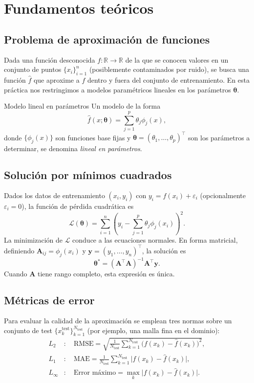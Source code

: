 \section{Fundamentos teóricos}

\subsection{Problema de aproximación de funciones}
Dada una función desconocida \(f: \mathbb{R} \to \mathbb{R}\) de la que se conocen valores en un conjunto de puntos \(\{x_i\}_{i=1}^n\) (posiblemente contaminados por ruido), se busca una función \(\hat{f}\) que aproxime a \(f\) dentro y fuera del conjunto de entrenamiento. En esta práctica nos restringimos a modelos paramétricos lineales en los parámetros \(\boldsymbol{\theta}\).

\begin{definicion}{Modelo lineal en parámetros}
Un modelo de la forma
\[
\hat{f}(x;\boldsymbol{\theta}) = \sum_{j=1}^{p} \theta_j \phi_j(x),
\]
donde \(\{\phi_j(x)\}\) son funciones base fijas y \(\boldsymbol{\theta} = (\theta_1,\dots,\theta_p)^\top\) son los parámetros a determinar, se denomina \emph{lineal en parámetros}.
\end{definicion}

\subsection{Solución por mínimos cuadrados}
Dados los datos de entrenamiento \((x_i, y_i)\) con \(y_i = f(x_i) + \varepsilon_i\) (opcionalmente \(\varepsilon_i = 0\)), la función de pérdida cuadrática es
\[
\mathcal{L}(\boldsymbol{\theta}) = \sum_{i=1}^{n} \left( y_i - \sum_{j=1}^{p} \theta_j \phi_j(x_i) \right)^2.
\]
La minimización de \(\mathcal{L}\) conduce a las ecuaciones normales. En forma matricial, definiendo \(\mathbf{A}_{ij} = \phi_j(x_i)\) y \(\mathbf{y} = (y_1,\dots,y_n)^\top\), la solución es
\[
\boldsymbol{\theta}^* = (\mathbf{A}^\top\mathbf{A})^{-1}\mathbf{A}^\top\mathbf{y}.
\]
Cuando \(\mathbf{A}\) tiene rango completo, esta expresión es única.

\subsection{Métricas de error}
Para evaluar la calidad de la aproximación se emplean tres normas sobre un conjunto de test \(\{x_k^{\text{test}}\}_{k=1}^{N_{\text{test}}}\) (por ejemplo, una malla fina en el dominio):
\begin{align}
L_2 &: \quad \text{RMSE} = \sqrt{\frac{1}{N_{\text{test}}} \sum_{k=1}^{N_{\text{test}}} \bigl( f(x_k) - \hat{f}(x_k) \bigr)^2},\\
L_1 &: \quad \text{MAE} = \frac{1}{N_{\text{test}}} \sum_{k=1}^{N_{\text{test}}} \bigl| f(x_k) - \hat{f}(x_k) \bigr|,\\
L_\infty &: \quad \text{Error máximo} = \max_{k} \bigl| f(x_k) - \hat{f}(x_k) \bigr|.
\end{align}

